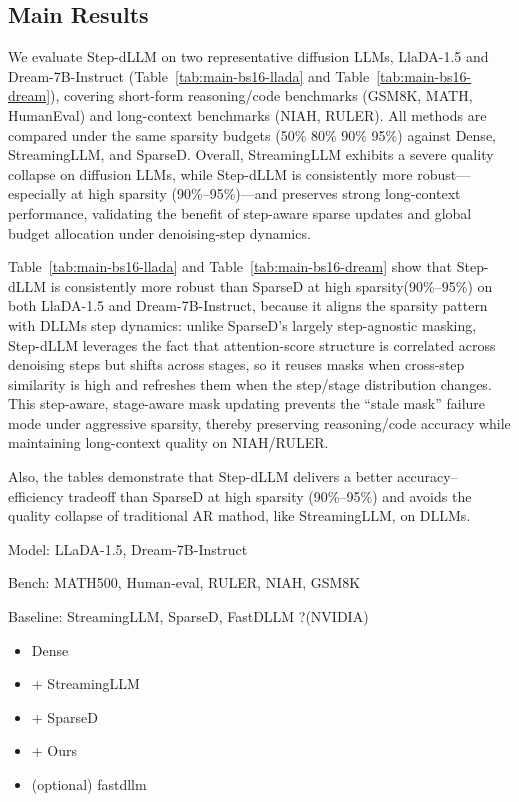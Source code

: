 \subsection{Main Results}
We evaluate Step-dLLM on two representative diffusion LLMs, LlaDA-1.5 and Dream-7B-Instruct (Table~\ref{tab:main-bs16-llada} and Table~\ref{tab:main-bs16-dream}), covering short-form reasoning/code benchmarks (GSM8K, MATH, HumanEval) and long-context benchmarks (NIAH, RULER). All methods are compared under the same sparsity budgets (50\% 80\% 90\% 95\%) against Dense, StreamingLLM, and SparseD. Overall, StreamingLLM exhibits a severe quality collapse on diffusion LLMs, while Step-dLLM is consistently more robust—especially at high sparsity (90\%–95\%)—and preserves strong long-context performance, validating the benefit of step-aware sparse updates and global budget allocation under denoising-step dynamics.

Table~\ref{tab:main-bs16-llada} and Table~\ref{tab:main-bs16-dream} show that Step-dLLM is consistently more robust than SparseD at high sparsity(90\%–95\%) on both LlaDA-1.5 and Dream-7B-Instruct, because it aligns the sparsity pattern with DLLMs step dynamics: unlike SparseD’s largely step-agnostic masking, Step-dLLM leverages the fact that attention-score structure is correlated across denoising steps but shifts across stages, so it reuses masks when cross-step similarity is high and refreshes them when the step/stage distribution changes. This step-aware, stage-aware mask updating prevents the “stale mask” failure mode under aggressive sparsity, thereby preserving reasoning/code accuracy while maintaining long-context quality on NIAH/RULER.

Also, the tables demonstrate that Step-dLLM delivers a better accuracy–efficiency tradeoff than SparseD at high sparsity (90\%–95\%) and avoids the quality collapse of traditional AR mathod, like StreamingLLM, on DLLMs.


Model: LLaDA-1.5, Dream-7B-Instruct

Bench: MATH500, Human-eval, RULER, NIAH, GSM8K

Baseline: StreamingLLM, SparseD, FastDLLM
?(NVIDIA)

\begin{itemize}
\item Dense
\item + StreamingLLM
\item + SparseD
\item + Ours
\item (optional) fastdllm
\end{itemize}

